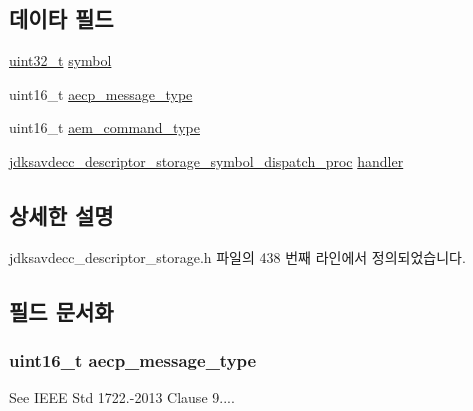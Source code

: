 \subsection*{데이타 필드}
\begin{DoxyCompactItemize}
\item 
\hyperlink{parse_8c_a6eb1e68cc391dd753bc8ce896dbb8315}{uint32\+\_\+t} \hyperlink{structjdksavdecc__descriptor__storage__symbol__dispatch__item_a0a81ee27053a63e71a6c7db060562eb0}{symbol}
\item 
uint16\+\_\+t \hyperlink{structjdksavdecc__descriptor__storage__symbol__dispatch__item_abffe273c99a54d51b078d2e26fafaa1b}{aecp\+\_\+message\+\_\+type}
\item 
uint16\+\_\+t \hyperlink{structjdksavdecc__descriptor__storage__symbol__dispatch__item_ac7453e2a1b6d4303571f709c46750bf1}{aem\+\_\+command\+\_\+type}
\item 
\hyperlink{group__jdksavdecc__descriptor__storage__symbol__dispatch_gaf1c817a8f34d849b268537e6093c69aa}{jdksavdecc\+\_\+descriptor\+\_\+storage\+\_\+symbol\+\_\+dispatch\+\_\+proc} \hyperlink{structjdksavdecc__descriptor__storage__symbol__dispatch__item_a7c652fe3a5cea7f258279784cf74cf36}{handler}
\end{DoxyCompactItemize}


\subsection{상세한 설명}


jdksavdecc\+\_\+descriptor\+\_\+storage.\+h 파일의 438 번째 라인에서 정의되었습니다.



\subsection{필드 문서화}
\subsubsection[{\texorpdfstring{aecp\+\_\+message\+\_\+type}{aecp_message_type}}]{\setlength{\rightskip}{0pt plus 5cm}uint16\+\_\+t aecp\+\_\+message\+\_\+type}\hypertarget{structjdksavdecc__descriptor__storage__symbol__dispatch__item_abffe273c99a54d51b078d2e26fafaa1b}{}\label{structjdksavdecc__descriptor__storage__symbol__dispatch__item_abffe273c99a54d51b078d2e26fafaa1b}
See I\+E\+EE Std 1722.-\/2013 Clause 9.... 

